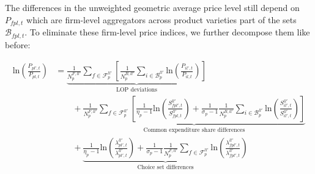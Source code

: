 The differences in the unweighted geometric average price level still depend on $P_{fpl,t}$ which are firm-level aggregators across product varieties part of the sets $\mathcal{B}_{fpl,t}$. To eliminate these firm-level price indices, we further decompose them like before:
\begin{linenomath*}
    \begin{equation}\label{eq:cle_decomp}
        \begin{aligned}
        \text{ln}\left(\frac{P_{pl',t}}{P_{pl,t}}\right)
            &=  \underbrace{
                    \frac{1}{N^{F,ll'}_{p}}
                    \sum_{f \in \mathcal{F}^{ll'}_{p}} 
                        \left[
                            \frac{1}{N^{B,ll'}_{p}}
                            \sum_{i \in \mathcal{B}^{ll'}_{p}} 
                            \text{ln}
                            \left(
                                \frac{P_{il',t}}{P_{il,t}}
                            \right)
                        \right]
                }_{\text{LOP deviations}} \\
                & \qquad + 
                \underbrace{
                    \frac{1}{N^{F,ll'}_{p}}
                    \sum_{f \in \mathcal{F}^{ll'}_{p}} 
                    \left[
                        \frac{1}{\eta_p-1}
                        \text{ln}
                        \left(
                            \frac{S^{ll'}_{fpl',t}}{S^{ll'}_{fpl,t}}
                        \right)
                        +
                        \frac{1}{\sigma_p-1}
                        \frac{1}{N^{B,ll'}_{p}}
                        \sum_{i \in \mathcal{B}^{ll'}_{p}} 
                            \text{ln}
                            \left(
                                \frac{S^{ll'}_{il',t}}{S^{ll'}_{il',t}}
                            \right)
                    \right]
                }_{\text{Common expenditure share differences}} \\
                & \qquad +
                \underbrace{
                    \frac{1}{\eta_p-1}
                    \text{ln}
                    \left(
                        \frac{\lambda^{ll'}_{pl',t}}{\lambda^{ll'}_{pl',t}}
                    \right)
                    + 
                    \frac{1}{\sigma_p-1}
                    \frac{1}{N^{F,ll'}_{p}}
                    \sum_{f \in \mathcal{F}^{ll'}_{p}} 
                        \text{ln}
                        \left(
                            \frac{\lambda^{ll'}_{fpl',t}}{\lambda^{ll'}_{fpl',t}}
                        \right)}_{\text{Choice set differences}}
    \end{aligned}
    \end{equation}
\end{linenomath*}
